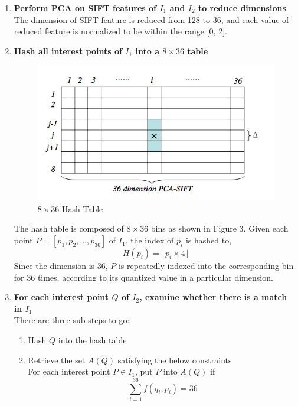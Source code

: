 \begin{enumerate}
  \item{\bfseries Perform PCA on SIFT features of $I_1$ and $I_2$ to reduce dimensions}
  The dimension of SIFT feature is reduced from 128 to 36, and each value of reduced feature is normalized to be within the range [0, 2]. 

  \item{\bfseries Hash all interest points of $I_1$ into a $8 \times 36$ table}

  \begin{figure}[!ht]
  \centering
    \includegraphics[scale = 0.8]{./hashTable.png}
  \caption{$8 \times 36$ Hash Table \cite{zhao2007near}}
  \end{figure}
  
  The hash table is composed of $8 \times 36$ bins as shown in Figure 3. Given each point $P = [p_1, p_2,..., p_{36}]$ of $I_1$, the index of $p_i$ is hashed to, 
  $$H(p_i) = \lfloor p_i \times 4 \rfloor$$ 
  Since the dimension is 36, $P$ is repeatedly indexed into the corresponding bin for 36 times, according to its quantized value in a particular dimension.   
  
  \item{\bfseries For each interest point $Q$ of $I_2$, examine whether there is a match in $I_1$}\\
  There are three sub steps to go:
    
    \begin{enumerate}
    \item {Hash $Q$ into the hash table}
    \item {Retrieve the set $A(Q)$ satisfying the below constraints}\\
    For each interest point $P \in I_1$, put $P$ into $A(Q)$ if $$\sum_{i=1}^{36}f(q_i, p_i) = 36$$ 


\end{enumerate}
\end{enumerate}
